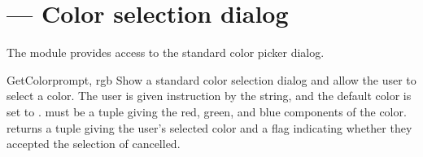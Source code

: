 \section{ ---
         Color selection dialog}



The  module provides access to the standard color
picker dialog.


\begin{funcdesc}{GetColor}{prompt, rgb}
  Show a standard color selection dialog and allow the user to select
  a color.  The user is given instruction by the  string,
  and the default color is set to .   must be a
  tuple giving the red, green, and blue components of the color.
   returns a tuple giving the user's selected
  color and a flag indicating whether they accepted the selection of
  cancelled.
\end{funcdesc}
